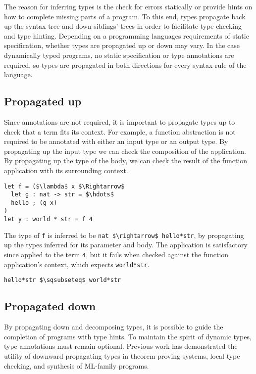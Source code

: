 \documentclass[sigplan]{acmart}
\theoremstyle{definition}
\begin{document}
The reason for inferring types is the check for errors statically or 
provide hints on how to complete missing parts of a program. To this end,
types propagate back up the syntax tree and down siblings' trees in order
to facilitate type checking and type hinting.
Depending on a programming languages requirements of static specification, 
whether types are propagated up or down may vary. 
In the case dynamically typed programs, no static specification or type annotations
are required, so types are propagated in both directions for every syntax rule
of the language.


\subsection{Propagated up}
Since annotations are not required, it is important to propagate types up to check
that a term fits its context.
For example, a function abstraction is not required to be annotated 
with either an input type or an output type. 
\noindent By propagating up the input type we can check the composition of the application.
By propagating up the type of the body, we can check the result of the function application 
with its surrounding context. 

\begin{lstlisting}
let f = ($\lambda$ x $\Rightarrow$ 
  let g : nat -> str = $\hdots$
  hello ; (g x)
) 
let y : world * str = f 4
\end{lstlisting}

The type of \lstinline{f} is inferred to be \lstinline{nat $\rightarrow$ hello*str}, 
by propagating up the types inferred for its parameter and body.
The application is satisfactory since applied to the term \lstinline{4}, 
but it fails when checked against the function application's context,
which expects \lstinline{world*str}.
\begin{lstlisting}
hello*str $\sqsubseteq$ world*str
\end{lstlisting}

\subsection{Propagated down}
By propagating down and decomposing types, 
it is possible to guide the completion of programs with type hints.
To maintain the spirit of dynamic types, type annotations must remain optional.
Previous work has demonstrated the utility of downward propagating types 
in theorem proving systems, local type checking, 
and synthesis of ML-family programs.
\end{document}
